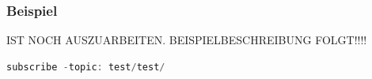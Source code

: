             \subsubsection*{Beispiel}
            \label{subsubsec:pubsub-example}
            IST NOCH AUSZUARBEITEN. BEISPIELBESCHREIBUNG FOLGT!!!! 
            \begin{lstlisting}[language=Java, frame=lines, xleftmargin=\parindent, style=algoBericht, label={code:entity}, captionpos=b, caption={Test test}]
                subscribe -topic: test/test/
            \end{lstlisting}


